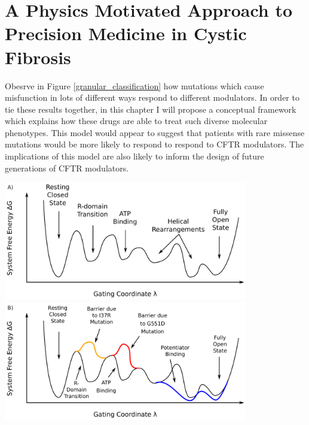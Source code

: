 \section{A Physics Motivated Approach to Precision Medicine in Cystic Fibrosis}
Obesrve in Figure \ref{granular_classification} how mutations which cause misfunction in lots of different ways respond to different modulators. In order to tie these results together, in this chapter I will propose a conceptual framework which explains how these drugs are able to treat such diverse molecular phenotypes. This model would appear to suggest that patients with rare missense mutations would be more likely to respond to respond to CFTR modulators. The implications of this model are also likely to inform the design of future generations of CFTR modulators. 

	\begin{center}
		\begingroup
	\includegraphics[width=0.8\textwidth]{figures/perspective/drug_landscape_1.pdf}\\
	\includegraphics[width=0.8\textwidth]{figures/perspective/drug_landscape_3.pdf}\\
		\endgroup
	\end{center}
	\begingroup
	\captionsetup{singlelinecheck = false, justification=raggedright}
